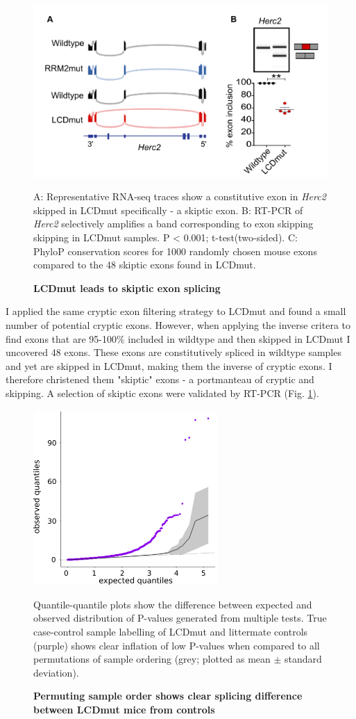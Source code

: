 \begin{figure}[h!]
	\centering
	\includegraphics[width=12cm]{Figures/05_tdp_mice/skiptic_exon_multi.png}
	\caption{\textbf{LCDmut leads to skiptic exon splicing}}
	A: Representative RNA-seq traces show a constitutive exon in \textit{Herc2} skipped in LCDmut specifically - a skiptic exon. B: RT-PCR of \textit{Herc2} selectively amplifies a band corresponding to exon skipping skipping in LCDmut samples. P < 0.001; t-test(two-sided). C: PhyloP conservation scores for 1000 randomly chosen mouse exons compared to the 48 skiptic exons found in LCDmut.
	\label{fig:skiptic_multi}
\end{figure}

I applied the same cryptic exon filtering strategy to LCDmut and found a small number of potential cryptic exons. However, when applying the inverse critera to find exons that are 95-100\% included in wildtype and then skipped in LCDmut I uncovered 48 exons. These exons are constitutively spliced in wildtype samples and yet are skipped in LCDmut, making them the inverse of cryptic exons. I therefore christened them "skiptic" exons - a portmanteau of cryptic and skipping. A selection of skiptic exons were validated by RT-PCR (Fig. \ref{fig:skiptic_multi}). 


\begin{figure}[h!]
	\centering
	\includegraphics[width=7cm]{Figures/05_tdp_mice/permutation_ribbon.png}
	\caption{\textbf{Permuting sample order shows clear splicing difference between LCDmut mice from controls}}
	Quantile-quantile plots show the difference between expected and observed distribution of P-values generated from multiple tests. True case-control sample labelling of LCDmut and littermate controls (purple) shows clear inflation of low P-values when compared to all permutations of sample ordering (grey; plotted as mean $\pm$ standard deviation).
	\label{fig:permutation}
\end{figure}

